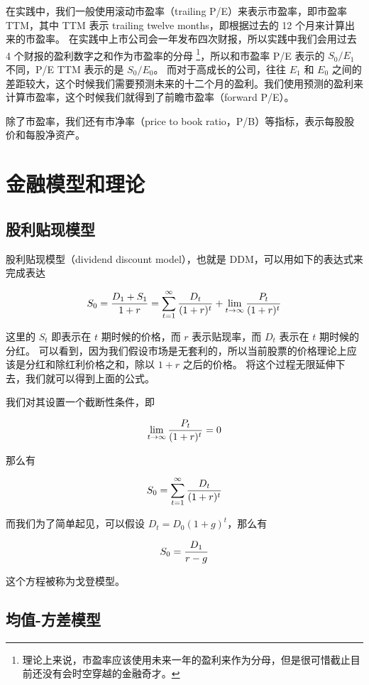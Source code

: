 \documentclass[utf8,a4paper,nofonts]{ctexbook}
\begin{document}
在实践中，我们一般使用滚动市盈率（trailing P/E）来表示市盈率，即市盈率 TTM，其中 TTM 表示 trailing twelve months，即根据过去的 12 个月来计算出来的市盈率。
在实践中上市公司会一年发布四次财报，所以实践中我们会用过去 4 个财报的盈利数字之和作为市盈率的分母
\footnote{理论上来说，市盈率应该使用未来一年的盈利来作为分母，但是很可惜截止目前还没有会时空穿越的金融奇才。}，所以和市盈率 P/E 表示的 $S_0 / E_1$ 不同，P/E TTM 表示的是 $S_0 / E_0$。
而对于高成长的公司，往往 $E_1$ 和 $E_0$ 之间的差距较大，这个时候我们需要预测未来的十二个月的盈利。我们使用预测的盈利来计算市盈率，这个时候我们就得到了前瞻市盈率（forward P/E）。

除了市盈率，我们还有市净率（price to book ratio，P/B）等指标，表示每股股价和每股净资产。

\section{金融模型和理论}

\subsection{股利贴现模型}
\label{title:DDM}

股利贴现模型（dividend discount model），也就是 DDM，可以用如下的表达式来完成表达

$$
S_0 = {D_1 + S_1 \over 1 + r} = \sum_{t=1}^{\infty} {D_t \over (1 + r)^t} + \lim_{t \to \infty} {P_t \over (1 + r)^t}
$$

这里的 $S_t$ 即表示在 $t$ 期时候的价格，而 $r$ 表示贴现率，而 $D_t$ 表示在 $t$ 期时候的分红。
可以看到，因为我们假设市场是无套利的，所以当前股票的价格理论上应该是分红和除红利价格之和，除以 $1 + r$ 之后的价格。
将这个过程无限延伸下去，我们就可以得到上面的公式。

我们对其设置一个截断性条件，即

$$
\lim_{t \to \infty} {P_t \over (1 + r)^t} = 0
$$

那么有

$$
S_0 = \sum_{t=1}^{\infty} {D_t \over (1 + r)^t}
$$

而我们为了简单起见，可以假设 $D_t = D_0 (1 + g)^t$，那么有

$$
S_0 = {D_1 \over r - g}
$$

这个方程被称为戈登模型。

\subsection{均值-方差模型}
\label{title:E-sigma-model}
\end{document}
